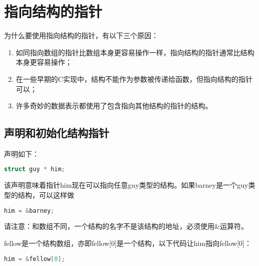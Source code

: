 \section{指向结构的指针}
\begin{frame}[fragile]\ft{\secname}
为什么要使用指向结构的指针，有以下三个原因：

\begin{enumerate}
\item 如同指向数组的指针比数组本身更容易操作一样，指向结构的指针通常比结构本身更容易操作；
\item 在一些早期的C实现中，结构不能作为参数被传递给函数，但指向结构的指针可以；
\item 许多奇妙的数据表示都使用了包含指向其他结构的指针的结构。
\end{enumerate}
\end{frame}

\subsection{声明和初始化结构指针}
\begin{frame}[fragile]\ft{\subsecname}
  声明如下：
    \begin{lstlisting}[language=c,backgroundcolor=\color{red!20}]
struct guy * him;
    \end{lstlisting}
该声明意味着指针{\tf him}现在可以指向任意{\tf guy}类型的结构。如果{\tf barney}是一个{\tf guy}类型的结构，可以这样做
    \begin{lstlisting}[language=c,backgroundcolor=\color{red!20}]
him = &barney;
    \end{lstlisting}
请注意：\textcolor{acolor1}{和数组不同，一个结构的名字不是该结构的地址，必须使用{\tf \&}运算符。}
\end{frame}

\begin{frame}[fragile]\ft{\subsecname}
  {\tf fellow}是一个结构数组，亦即{\tf fellow[0]}是一个结构，以下代码让{\tf him}指向{\tf fellow[0]}：
    \begin{lstlisting}[language=c,backgroundcolor=\color{red!20}]
him = &fellow[0];
    \end{lstlisting}

\end{frame}

